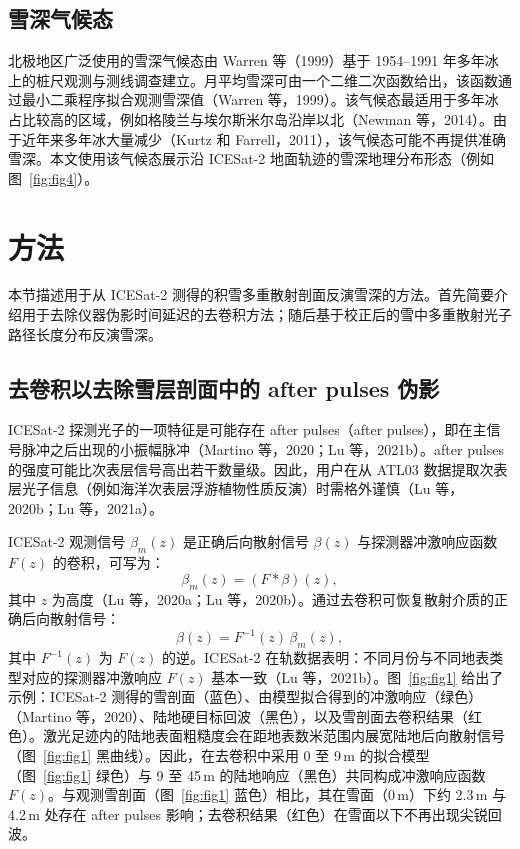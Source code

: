 \subsection{雪深气候态}
北极地区广泛使用的雪深气候态由 Warren 等（1999）基于 1954--1991 年多年冰上的桩尺观测与测线调查建立。月平均雪深可由一个二维二次函数给出，该函数通过最小二乘程序拟合观测雪深值（Warren 等，1999）。该气候态最适用于多年冰占比较高的区域，例如格陵兰与埃尔斯米尔岛沿岸以北（Newman 等，2014）。由于近年来多年冰大量减少（Kurtz 和 Farrell，2011），该气候态可能不再提供准确雪深。本文使用该气候态展示沿 ICESat-2 地面轨迹的雪深地理分布形态（例如图~\ref{fig:fig4}）。

\section{方法}
本节描述用于从 ICESat-2 测得的积雪多重散射剖面反演雪深的方法。首先简要介绍用于去除仪器伪影时间延迟的去卷积方法；随后基于校正后的雪中多重散射光子路径长度分布反演雪深。

\subsection{去卷积以去除雪层剖面中的 after pulses 伪影}
ICESat-2 探测光子的一项特征是可能存在 after pulses（after pulses），即在主信号脉冲之后出现的小振幅脉冲（Martino 等，2020；Lu 等，2021b）。after pulses 的强度可能比次表层信号高出若干数量级。因此，用户在从 ATL03 数据提取次表层光子信息（例如海洋次表层浮游植物性质反演）时需格外谨慎（Lu 等，2020b；Lu 等，2021a）。

ICESat-2 观测信号 $\beta_m(z)$ 是正确后向散射信号 $\beta(z)$ 与探测器冲激响应函数 $F(z)$ 的卷积，可写为：
\begin{equation}
\beta_m(z) = (F * \beta)(z),
\end{equation}
其中 $z$ 为高度（Lu 等，2020a；Lu 等，2020b）。通过去卷积可恢复散射介质的正确后向散射信号：
\begin{equation}
\beta(z) = F^{-1}(z)\,\beta_m(z),
\end{equation}
其中 $F^{-1}(z)$ 为 $F(z)$ 的逆。ICESat-2 在轨数据表明：不同月份与不同地表类型对应的探测器冲激响应 $F(z)$ 基本一致（Lu 等，2021b）。图~\ref{fig:fig1} 给出了示例：ICESat-2 测得的雪剖面（蓝色）、由模型拟合得到的冲激响应（绿色）（Martino 等，2020）、陆地硬目标回波（黑色），以及雪剖面去卷积结果（红色）。激光足迹内的陆地表面粗糙度会在距地表数米范围内展宽陆地后向散射信号（图~\ref{fig:fig1} 黑曲线）。因此，在去卷积中采用 0 至 9\,m 的拟合模型（图~\ref{fig:fig1} 绿色）与 9 至 45\,m 的陆地响应（黑色）共同构成冲激响应函数 $F(z)$。与观测雪剖面（图~\ref{fig:fig1} 蓝色）相比，其在雪面（0\,m）下约 2.3\,m 与 4.2\,m 处存在 after pulses 影响；去卷积结果（红色）在雪面以下不再出现尖锐回波。

